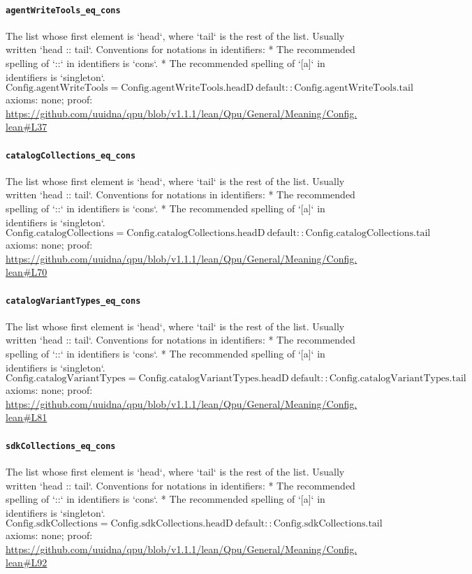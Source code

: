 \documentclass[11pt]{article}
\begin{document}
\paragraph{\texttt{agentWriteTools\_eq\_cons}}
The list whose first element is `head`, where `tail` is the rest of the list. Usually written `head :: tail`.   Conventions for notations in identifiers:   * The recommended spelling of `::` in identifiers is `cons`.   * The recommended spelling of `[a]` in identifiers is `singleton`.
\[ \mathrm{Config.agentWriteTools} = \mathrm{Config.agentWriteTools.headD}\ \mathrm{default} :: \mathrm{Config.agentWriteTools.tail} \]
\noindent axioms: none; proof: \url{https://github.com/uuidna/qpu/blob/v1.1.1/lean/Qpu/General/Meaning/Config.lean\#L37}

\paragraph{\texttt{catalogCollections\_eq\_cons}}
The list whose first element is `head`, where `tail` is the rest of the list. Usually written `head :: tail`.   Conventions for notations in identifiers:   * The recommended spelling of `::` in identifiers is `cons`.   * The recommended spelling of `[a]` in identifiers is `singleton`.
\[ \mathrm{Config.catalogCollections} = \mathrm{Config.catalogCollections.headD}\ \mathrm{default} :: \mathrm{Config.catalogCollections.tail} \]
\noindent axioms: none; proof: \url{https://github.com/uuidna/qpu/blob/v1.1.1/lean/Qpu/General/Meaning/Config.lean\#L70}

\paragraph{\texttt{catalogVariantTypes\_eq\_cons}}
The list whose first element is `head`, where `tail` is the rest of the list. Usually written `head :: tail`.   Conventions for notations in identifiers:   * The recommended spelling of `::` in identifiers is `cons`.   * The recommended spelling of `[a]` in identifiers is `singleton`.
\[ \mathrm{Config.catalogVariantTypes} = \mathrm{Config.catalogVariantTypes.headD}\ \mathrm{default} :: \mathrm{Config.catalogVariantTypes.tail} \]
\noindent axioms: none; proof: \url{https://github.com/uuidna/qpu/blob/v1.1.1/lean/Qpu/General/Meaning/Config.lean\#L81}

\paragraph{\texttt{sdkCollections\_eq\_cons}}
The list whose first element is `head`, where `tail` is the rest of the list. Usually written `head :: tail`.   Conventions for notations in identifiers:   * The recommended spelling of `::` in identifiers is `cons`.   * The recommended spelling of `[a]` in identifiers is `singleton`.
\[ \mathrm{Config.sdkCollections} = \mathrm{Config.sdkCollections.headD}\ \mathrm{default} :: \mathrm{Config.sdkCollections.tail} \]
\noindent axioms: none; proof: \url{https://github.com/uuidna/qpu/blob/v1.1.1/lean/Qpu/General/Meaning/Config.lean\#L92}
\end{document}
